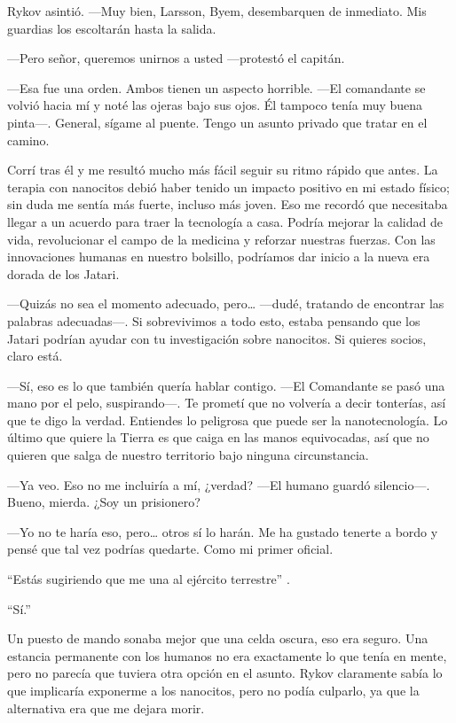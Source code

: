 Rykov asintió. —Muy bien, Larsson, Byem, desembarquen de inmediato. Mis guardias los escoltarán hasta la salida.

—Pero señor, queremos unirnos a usted —protestó el capitán.

—Esa fue una orden. Ambos tienen un aspecto horrible. —El comandante se volvió hacia mí y noté las ojeras bajo sus ojos. Él tampoco tenía muy buena pinta—. General, sígame al puente. Tengo un asunto privado que tratar en el camino.

Corrí tras él y me resultó mucho más fácil seguir su ritmo rápido que antes. La terapia con nanocitos debió haber tenido un impacto positivo en mi estado físico; sin duda me sentía más fuerte, incluso más joven. Eso me recordó que necesitaba llegar a un acuerdo para traer la tecnología a casa. Podría mejorar la calidad de vida, revolucionar el campo de la medicina y reforzar nuestras fuerzas. Con las innovaciones humanas en nuestro bolsillo, podríamos dar inicio a la nueva era dorada de los Jatari.

—Quizás no sea el momento adecuado, pero… —dudé, tratando de encontrar las palabras adecuadas—. Si sobrevivimos a todo esto, estaba pensando que los Jatari podrían ayudar con tu investigación sobre nanocitos. Si quieres socios, claro está.

—Sí, eso es lo que también quería hablar contigo. —El Comandante se pasó una mano por el pelo, suspirando—. Te prometí que no volvería a decir tonterías, así que te digo la verdad. Entiendes lo peligrosa que puede ser la nanotecnología. Lo último que quiere la Tierra es que caiga en las manos equivocadas, así que no quieren que salga de nuestro territorio bajo ninguna circunstancia.

—Ya veo. Eso no me incluiría a mí, ¿verdad? —El humano guardó silencio—. Bueno, mierda. ¿Soy un prisionero?

—Yo no te haría eso, pero… otros sí lo harán. Me ha gustado tenerte a bordo y pensé que tal vez podrías quedarte. Como mi primer oficial.

``Estás sugiriendo que me una al ejército terrestre''
.

``Sí.''


Un puesto de mando sonaba mejor que una celda oscura, eso era seguro. Una estancia permanente con los humanos no era exactamente lo que tenía en mente, pero no parecía que tuviera otra opción en el asunto. Rykov claramente sabía lo que implicaría exponerme a los nanocitos, pero no podía culparlo, ya que la alternativa era que me dejara morir.

